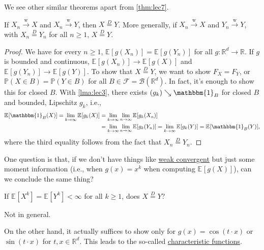 We see other similar theorems apart from \autoref{thm:lec7}.

\begin{theorem}\label{thm:lec8}
	If \(X_n \overset{\text{w} }{\to } X\) and \(X_n \overset{\text{w} }{\to } Y\), then \(X \overset{D}{=} Y\). More generally, if \(X_n \overset{\text{w} }{\to } X\) and \(Y_n \overset{\text{w} }{\to } Y\), with \(X_n \overset{D}{=} Y_n\) for all \(n \geq 1\), \(X \overset{D}{=} Y\).
\end{theorem}
\begin{proof}
	We have for every \(n \geq 1\), \(\mathbb{E}_{}[g(X_n)] = \mathbb{E}_{}[g(Y_n)] \) for all \(g \colon \mathbb{R} ^d \to \mathbb{R} \). If \(g\) is bounded and continuous, \(\mathbb{E}_{}[g(X_n)] \to \mathbb{E}_{}[g(X)] \) and \(\mathbb{E}_{}[g(Y_n)] \to \mathbb{E}_{}[g(Y)] \). To show that \(X \overset{D}{=} Y\), we want to show \(F_X = F_Y\), or \(\mathbb{P} (X \in B) = \mathbb{P} (Y \in B)\) for all \(B \in \mathscr{F} = \mathcal{B} (\mathbb{R} ^d)\). In fact, it's enough to show this for closed \(B\). With \autoref{lma:lec3}, there exists \((g_k) \searrow \mathbbm{1}_{B} \) for closed \(B\) and bounded, Lipschitz \(g_k\), i.e.,
	\[
		\begin{split}
			\mathbb{E}_{}[\mathbbm{1}_{B} (X)]
			= \lim_{k \to \infty} \mathbb{E}_{}[g_k(X)]
			 & = \lim_{k \to \infty} \lim_{n \to \infty} \mathbb{E}_{}[g_k(X_n)] \\
			 & = \lim_{k \to \infty} \lim_{n \to \infty} \mathbb{E}_{}[g_k(Y_n)]
			= \lim_{k \to \infty} \mathbb{E}_{}[g_k(Y)]
			= \mathbb{E}_{}[\mathbbm{1}_{B} (Y)],
		\end{split}
	\]
	where the third equality follows from the fact that \(X_n \overset{D}{=} Y_n \).
\end{proof}

One question is that, if we don't have things like \hyperref[def:converge-weakly]{weak convergent} but just some moment information (i.e., when \(g(x) = x^k\) when computing \(\mathbb{E}_{}[g(X)] \)), can we conclude the same thing?

\begin{problem*}
	If \(\mathbb{E}_{}[X^k] = \mathbb{E}_{}[Y^k] < \infty \) for all \(k \geq 1\), does \(X \overset{D}{=} Y\)?
\end{problem*}
\begin{answer}
	Not in general.
\end{answer}

On the other hand, it actually suffices to show only for \(g(x) = \cos (t\cdot x)\) or \(\sin (t\cdot x)\) for \(t, x\in \mathbb{R} ^d\). This leads to the so-called \hyperref[def:characteristic-function]{characteristic functions}.

